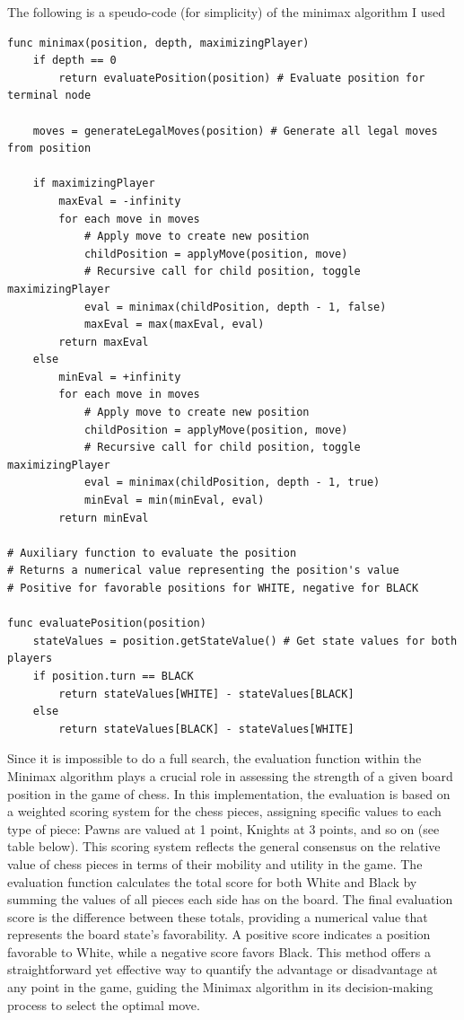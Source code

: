 \documentclass{article}
\begin{document}
The following is a speudo-code (for simplicity) of the minimax algorithm I used

\begin{lstlisting}[caption={Pseudo-Code of the minimax used}, label=lst:pseudocode]
func minimax(position, depth, maximizingPlayer)
    if depth == 0
        return evaluatePosition(position) # Evaluate position for terminal node

    moves = generateLegalMoves(position) # Generate all legal moves from position

    if maximizingPlayer
        maxEval = -infinity
        for each move in moves
            # Apply move to create new position
            childPosition = applyMove(position, move)
            # Recursive call for child position, toggle maximizingPlayer
            eval = minimax(childPosition, depth - 1, false)
            maxEval = max(maxEval, eval)
        return maxEval
    else
        minEval = +infinity
        for each move in moves
            # Apply move to create new position
            childPosition = applyMove(position, move)
            # Recursive call for child position, toggle maximizingPlayer
            eval = minimax(childPosition, depth - 1, true)
            minEval = min(minEval, eval)
        return minEval

# Auxiliary function to evaluate the position
# Returns a numerical value representing the position's value
# Positive for favorable positions for WHITE, negative for BLACK

func evaluatePosition(position)
    stateValues = position.getStateValue() # Get state values for both players
    if position.turn == BLACK
        return stateValues[WHITE] - stateValues[BLACK]
    else
        return stateValues[BLACK] - stateValues[WHITE]

\end{lstlisting}

Since it is impossible to do a full search, the evaluation function within the Minimax algorithm plays a crucial role in assessing the strength of a given board position in the game of chess. In this implementation, the evaluation is based on a weighted scoring system for the chess pieces, assigning specific values to each type of piece: Pawns are valued at 1 point, Knights at 3 points, and so on (see table below). This scoring system reflects the general consensus on the relative value of chess pieces in terms of their mobility and utility in the game. The evaluation function calculates the total score for both White and Black by summing the values of all pieces each side has on the board. The final evaluation score is the difference between these totals, providing a numerical value that represents the board state's favorability. A positive score indicates a position favorable to White, while a negative score favors Black. This method offers a straightforward yet effective way to quantify the advantage or disadvantage at any point in the game, guiding the Minimax algorithm in its decision-making process to select the optimal move.
\end{document}
